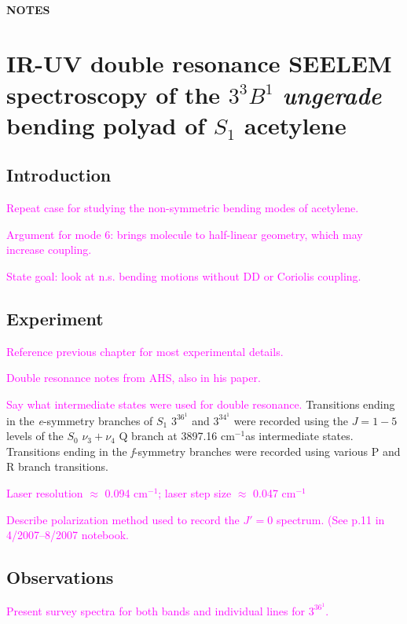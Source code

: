 \documentclass[12pt]{mitthesis}
\newcommand{\POINT}[1]{\textcolor{magenta}{#1}}
\newcommand{\rcm}{cm$^{-1}$}
\begin{document}
\tableofcontents
\clearpage

\subsubsection*{NOTES}
\clearpage

\chapter{IR-UV double resonance SEELEM spectroscopy of the $3^3B^1$
  \emph{ungerade} bending polyad of $S_1$ acetylene}

\section{Introduction}

\POINT{Repeat case for studying the non-symmetric bending modes of
  acetylene.}

\POINT{Argument for mode 6: brings molecule to half-linear geometry,
  which may increase coupling.}

\POINT{State goal: look at n.s. bending motions without DD or Coriolis
  coupling.}


\section{Experiment}

\POINT{Reference previous chapter for most experimental details.}

\POINT{Double resonance notes from AHS, also in his paper.}

\POINT{Say what intermediate states were used for double resonance.}
Transitions ending in the \emph{e}-symmetry branches of $S_1$ $3^36^1$
and $3^34^1$ were recorded using the $J=1-5$ levels of the $S_0$
$\nu_3+\nu_4$ Q branch at 3897.16 \rcm as intermediate states.
Transitions ending in the \emph{f}-symmetry branches were recorded
using various P and R branch transitions.

\POINT{Laser resolution $\approx$ 0.094 \rcm; laser step size
  $\approx$ 0.047 \rcm }

\POINT{Describe polarization method used to record the $J'=0$
  spectrum.  (See p.11 in 4/2007--8/2007 notebook.}

\section{Observations}

\POINT{Present survey spectra for both bands and individual lines for
  $3^36^1$.}
\end{document}
